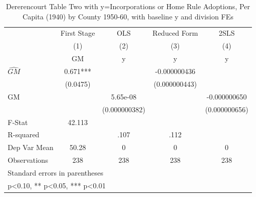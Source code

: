 \begin{table}[htbp]\centering
\def\sym#1{\ifmmode^{#1}\else\(^{#1}\)\fi}
\caption{Dererencourt Table Two with y=Incorporations or Home Rule Adoptions, Per Capita (1940) by County 1950-60, with baseline y and division FEs}
\begin{tabular}{l*{4}{c}}
\toprule
                    & First Stage   &         OLS   &Reduced Form   &        2SLS   \\
                    &\multicolumn{1}{c}{(1)}&\multicolumn{1}{c}{(2)}&\multicolumn{1}{c}{(3)}&\multicolumn{1}{c}{(4)}\\
                    &\multicolumn{1}{c}{GM}&\multicolumn{1}{c}{y}&\multicolumn{1}{c}{y}&\multicolumn{1}{c}{y}\\
\midrule
$\hat{GM}$          &       0.671***&               &-0.000000436   &               \\
                    &    (0.0475)   &               &(0.000000443)   &               \\
\addlinespace
GM                  &               &    5.65e-08   &               &-0.000000650   \\
                    &               &(0.000000382)   &               &(0.000000656)   \\
\midrule
F-Stat              &      42.113   &               &               &               \\
R-squared           &               &        .107   &        .112   &               \\
Dep Var Mean        &       50.28   &           0   &           0   &           0   \\
Observations        &         238   &         238   &         238   &         238   \\
\bottomrule
\multicolumn{5}{l}{\footnotesize Standard errors in parentheses}\\
\multicolumn{5}{l}{\footnotesize * p<0.10, ** p<0.05, *** p<0.01}\\
\end{tabular}
\end{table}
